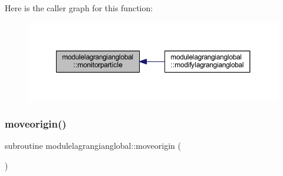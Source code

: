 Here is the caller graph for this function\+:\nopagebreak
\begin{figure}[H]
\begin{center}
\leavevmode
\includegraphics[width=350pt]{namespacemodulelagrangianglobal_a7e475a743774ea592904d34712f40255_icgraph}
\end{center}
\end{figure}
\mbox{\label{namespacemodulelagrangianglobal_a214f6221918e0904f9300fa3b9a00cb3}} 
\subsubsection{\texorpdfstring{moveorigin()}{moveorigin()}}
{\footnotesize\ttfamily subroutine modulelagrangianglobal\+::moveorigin (\begin{DoxyParamCaption}{ }\end{DoxyParamCaption})\hspace{0.3cm}{\ttfamily [private]}}

